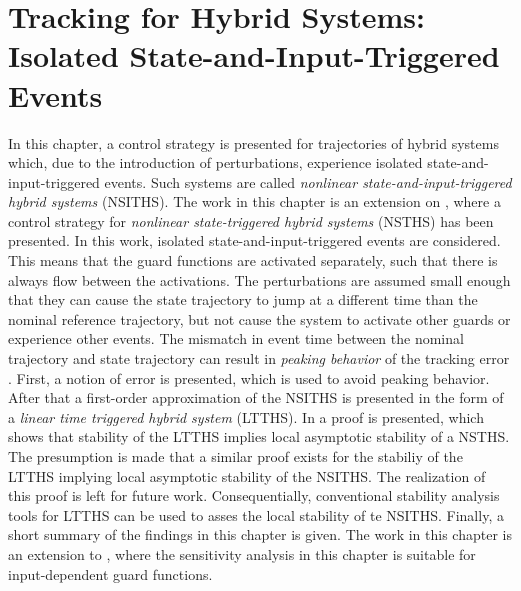 \documentclass[../DC2017114Bouma.tex]{subfiles}
\begin{document}
\graphicspath{{03_Contribution/img/}}
\renewcommand{\chaptermark}[1]{\markboth{\thechapter.\ #1}{}}
\renewcommand{\sectionmark}[1]{\markright{#1}{}}

\pagestyle{fancyreport}
\cleartooddpage
\pagestyle{fancyreport}
\chapter{Tracking for Hybrid Systems: Isolated State-and-Input-Triggered Events}\label{ch:order}
In this chapter, a control strategy is presented for trajectories of hybrid systems which, due to the introduction of perturbations, experience isolated state-and-input-triggered events. Such systems are called \textit{nonlinear state-and-input-triggered hybrid systems} (NSITHS). The work in this chapter is an extension on \cite{Saccon2014,Rijnen2017}, where a control strategy for \textit{nonlinear state-triggered hybrid systems} (NSTHS) has been presented. In this work, isolated state-and-input-triggered events are considered. This means that the guard functions are activated separately, such that there is always flow between the activations. The perturbations are assumed small enough that they can cause the state trajectory to jump at a different time than the nominal reference trajectory, but not cause the system to activate other guards or experience other events. The mismatch in event time between the nominal trajectory and state trajectory can result in \textit{peaking behavior} of the tracking error \cite{Menini2001,Biemond2013}. First, a notion of error is presented, which is used to avoid peaking behavior. After that a first-order approximation of the NSITHS is presented in the form of a \textit{linear time triggered hybrid system} (LTTHS). In \cite{Rijnen2017} a proof is presented, which shows that stability of the LTTHS implies local asymptotic stability of a NSTHS. The presumption is made that a similar proof exists for the stabiliy of the LTTHS implying local asymptotic stability of the NSITHS. The realization of this proof is left for future work. Consequentially, conventional stability analysis tools for LTTHS can be used to asses the local stability of te NSITHS. Finally, a short summary of the findings in this chapter is given. The work in this chapter is an extension to \cite{Rijnen2017}, where the sensitivity analysis in this chapter is suitable for input-dependent guard functions.
%
%
\end{document}
